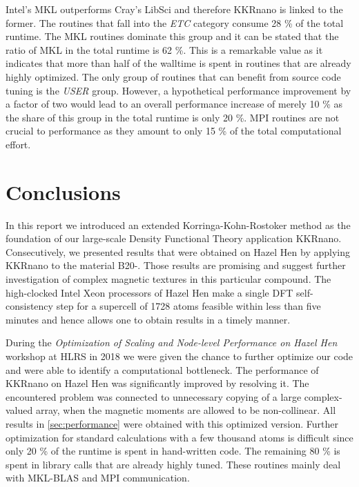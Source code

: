 \documentclass[graybox]{svmult}
\begin{document}
Intel's MKL outperforms Cray's LibSci and therefore KKRnano is linked to the former.
The routines that fall into the \textit{ETC} category consume 28 \% of the total runtime. 
The MKL routines dominate this group and it can be stated that the ratio of MKL in the total runtime is 62 \%.
This is a remarkable value as it indicates that more than half of the walltime is spent in routines
that are already highly optimized.
The only group of routines that can benefit from source code tuning is the \textit{USER} group.
However, a hypothetical performance improvement by a factor of two would lead to
an overall performance increase of merely 10 \% as the share of this group in the total runtime is only 20 \%.
MPI routines are not crucial to performance as they amount to only 15 \% of the total
computational effort.


\section{Conclusions}
In this report we introduced an extended Korringa-Kohn-Rostoker method as the foundation of our large-scale
Density Functional Theory application KKRnano. 
Consecutively, we presented results that were obtained on Hazel Hen 
by applying KKRnano to the material B20-.
Those results are promising and suggest further investigation
of complex magnetic textures in this particular compound.
The high-clocked Intel Xeon processors of Hazel Hen
make a single DFT self-consistency step for a supercell of 1728 atoms feasible within 
less than five minutes and hence allows one
to obtain results in a timely manner.

During the
\textit{Optimization of Scaling and Node-level Performance on Hazel Hen} workshop at HLRS in 2018 we were
given the chance to further optimize our code and were able to identify a computational bottleneck. 
The performance of KKRnano on Hazel Hen was significantly improved by resolving it. The encountered problem was
connected to unnecessary copying of a large complex-valued array, when the magnetic moments are allowed to be
non-collinear.
All results in \cref{sec:performance} were
obtained with this optimized version.
Further optimization for standard calculations with a few thousand atoms 
is difficult since only 20 \% of the runtime is spent in hand-written code. The remaining 80 \% is spent in
library calls that are already highly tuned. These routines mainly deal with
MKL-BLAS and MPI communication.
\end{document}
